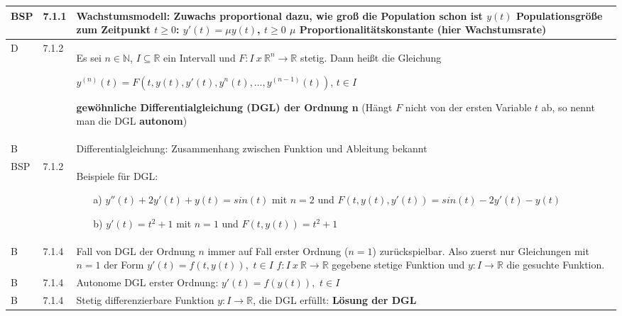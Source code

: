     \begin{longtable}{p{0.75cm} p{1cm} p{16cm}}
        \toprule
        BSP & 7.1.1 &   Wachstumsmodell: Zuwachs proportional dazu, wie groß die Population schon ist \hfill \break
                        $y(t)$ Populationsgröße zum Zeitpunkt $ t \geq 0$: $y'(t) = \mu y(t)$, $t\geq0$ \hfill \break
                        $\mu$ Proportionalitätskonstante (hier Wachstumsrate) \\
        \midrule
        D   & 7.1.2 &   Es sei $n \in \mathbb{N}$, $I \subseteq \mathbb{R}$ ein Intervall und $F: I~x~\mathbb{R}^n \rightarrow \mathbb{R}$ stetig.
                        Dann heißt die Gleichung \hfill \break
                        \centerline{$ y^{(n)}(t) = F(t,y(t), y'(t), y^n(t), \dots, y^{(n-1)}(t))$, $t\in I$} 
                        \textbf{gewöhnliche Differentialgleichung (DGL) der Ordnung n} \hfill \break
                        (Hängt $F$ nicht von der ersten Variable $t$ ab, so nennt man die DGL \textbf{autonom}) \\
        \midrule
        B   &       &   Differentialgleichung: Zusammenhang zwischen Funktion und Ableitung bekannt \\
        \midrule
        BSP & 7.1.2 &   Beispiele für DGL:
                        \begin{itemize}[topsep=-0.5cm]
                            \item[a)] $y''(t) + 2 y'(t) + y(t) = sin(t)$ mit $n=2$ und $F(t,y(t), y'(t)) = sin(t) - 2y'(t) - y(t)$ 
                            \item[b)] $y'(t) = t^2 + 1$ mit $n = 1$ und $F(t,y(t)) = t^2 +1$ 
                        \end{itemize} \vspace{-0cm} \\
        \midrule
        B   & 7.1.4 &   Fall von DGL der Ordnung $n$ immer auf Fall erster Ordnung ($n=1$) zurückspielbar. \hfill \break
                        Also zuerst nur Gleichungen mit $n=1$ der Form $y'(t) = f(t,y(t)),$ $t\in I$ \hfill \break
                        $f : I ~x~\mathbb{R} \rightarrow \mathbb{R}$ gegebene stetige Funktion und $y: I \rightarrow \mathbb{R}$ die gesuchte Funktion. \\
        \midrule
        B   & 7.1.4 &   Autonome DGL erster Ordnung: $y'(t) = f(y(t)),$ $t\in I$ \\
        \midrule
        B   & 7.1.4 &   Stetig differenzierbare Funktion $y: I \rightarrow \mathbb{R}$, die DGL erfüllt: \textbf{Lösung der DGL} \\

\end{longtable}
